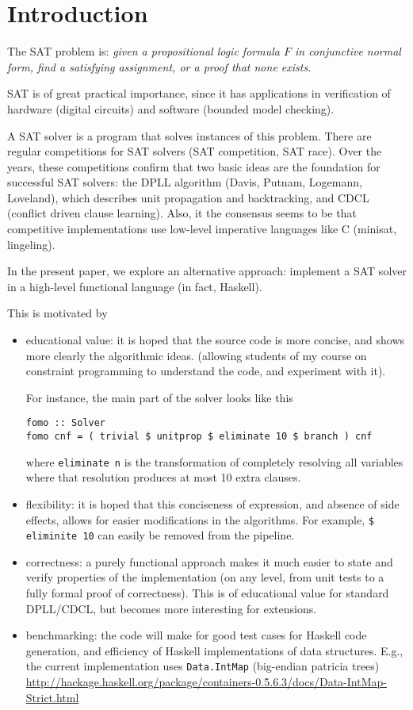 \section{Introduction}

The SAT problem is: \emph{given a propositional logic formula $F$ in conjunctive
normal form, find a satisfying assignment, or a proof that none exists}.

SAT is of great practical importance, since it has applications in
verification of hardware (digital circuits) and software (bounded model checking).

A SAT solver is a program that solves instances of this problem.
There are regular competitions for SAT solvers (SAT competition, SAT race).
Over the years, these competitions confirm that two basic ideas are the foundation 
for successful SAT solvers: the DPLL algorithm (Davis, Putnam, Logemann, Loveland),
which describes unit propagation and backtracking,
and CDCL (conflict driven clause learning).
Also, it the consensus seems to be that competitive implementations
use low-level imperative languages like C (minisat, lingeling).

In the present paper, we explore an alternative approach: 
implement a SAT solver in a high-level functional language (in fact, Haskell).

This is motivated by
\begin{itemize}
\item educational value:
  it is hoped that the source code is more concise,
  and shows more clearly the algorithmic ideas.
  (allowing students of my course on constraint programming
  to understand the code, and experiment with it).

  For instance, the main part of the solver looks like this
\begin{verbatim}
fomo :: Solver
fomo cnf = ( trivial $ unitprop $ eliminate 10 $ branch ) cnf
\end{verbatim}
where \verb|eliminate n| is the transformation of completely resolving
all variables where that resolution produces at most 10 extra clauses.
\item flexibility:
  it is hoped that this conciseness of expression, and absence of side effects, 
  allows for easier modifications in the algorithms.
  For example, \verb|$ eliminite 10| can easily be removed from the pipeline.
\item correctness:
  a purely functional approach makes it much easier to state and verify properties
  of the implementation (on any level, from unit tests to a fully formal proof of
  correctness). This is of educational value for standard DPLL/CDCL,
  but becomes more interesting for extensions.
\item benchmarking:
  the code will make for good test cases for Haskell code generation,
  and efficiency of Haskell implementations of data structures.
  E.g., the current implementation uses \verb|Data.IntMap| (big-endian patricia trees)
  \url{http://hackage.haskell.org/package/containers-0.5.6.3/docs/Data-IntMap-Strict.html}
\end{itemize}

